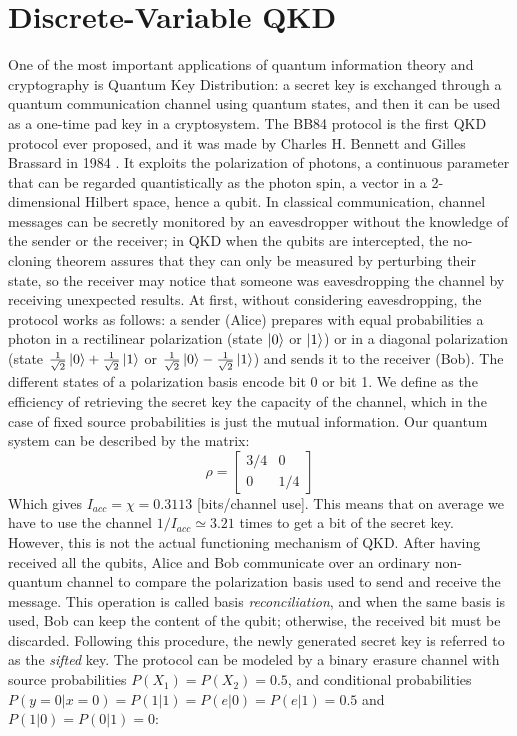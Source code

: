 \documentclass[journal, letterpaper]{IEEEtran}
\begin{document}
\section{Discrete-Variable QKD}
One of the most important applications of quantum information theory and cryptography is Quantum Key Distribution:
a secret key is exchanged through a quantum communication channel using quantum states, and then it can be used as a one-time pad key in a cryptosystem\cite{magarini}. The BB84 protocol is the first QKD protocol ever proposed, and it was made by Charles H. Bennett and Gilles Brassard in 1984 \cite{bb84,moderncrypto}. It exploits the polarization of photons, a continuous parameter that can be regarded quantistically as the photon spin\cite{spin}, a vector in a 2-dimensional Hilbert space, hence a qubit. In classical communication, channel messages can be secretly monitored by an eavesdropper without the knowledge of the sender or the receiver; in QKD when the qubits are intercepted, the no-cloning theorem assures that they can only be measured by perturbing their state, so the receiver may notice that someone was eavesdropping the channel by receiving unexpected results. At first, without considering eavesdropping, the protocol works as follows: a sender (Alice) prepares with equal probabilities a photon in a rectilinear polarization (state $\ket{0}$ or $\ket{1}$) or in a diagonal polarization (state $\frac{1}{\sqrt{2}}\ket{0}+\frac{1}{\sqrt{2}}\ket{1}$ or $\frac{1}{\sqrt{2}}\ket{0}-\frac{1}{\sqrt{2}}\ket{1}$) and sends it to the receiver (Bob). The different states of a polarization basis encode bit 0 or bit 1. We define as the efficiency of retrieving the secret key the capacity of
the channel, which in the case of fixed source probabilities is just the mutual information.
Our quantum system can be described by the matrix: 
\[\rho = \begin{bmatrix}
    3/4 & 0 \\
    0 & 1/4   
\end{bmatrix}\] 
Which gives $I_{acc} = \chi = 0.3113$ [bits/channel use]. This means that on average we have to use the channel $1/I_{acc} \simeq 3.21$ times to get a bit of the secret key. However, this is not the actual functioning mechanism of QKD. After having received all the qubits, Alice and Bob communicate over an ordinary non-quantum channel to compare the polarization basis used to send and receive the message. This operation is called basis \textit{reconciliation}, and when the same basis is used, Bob can keep the content of the qubit; otherwise, the received bit must be discarded. Following this procedure, the newly generated secret key is referred to as the \textit{sifted} key. The protocol can be modeled by a binary erasure channel with source probabilities $P(X_1) = P(X_2) = 0.5$, and conditional probabilities $P(y=0|x=0) = P(1|1) = P(e|0) = P(e|1) = 0.5$ and $P(1|0) = P(0|1) = 0$: 
\end{document}
